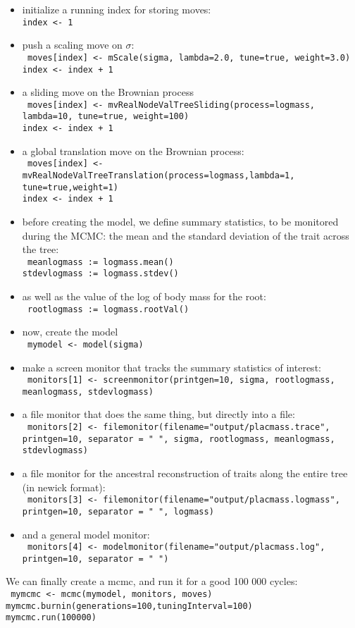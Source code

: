 \documentclass[usletter]{article}
\newcommand{\cmd}[1]{\texttt{#1}}
\begin{document}
\begin{itemize}
\item
initialize a running index for storing moves:
\\
\cmd{index <- 1}
\item
push a scaling move on $\sigma$:
\\
\cmd{
moves[index] <- mScale(sigma, lambda=2.0, tune=true, weight=3.0)
\\
index <- index + 1
}
\item
a sliding move on the Brownian process
\\
\cmd{
moves[index] <- mvRealNodeValTreeSliding(process=logmass, lambda=10, tune=true, weight=100)
\\
index <- index + 1
}
\item
a global translation move on the Brownian process:
\\
\cmd{
moves[index] <- mvRealNodeValTreeTranslation(process=logmass,lambda=1,
\\
tune=true,weight=1)
\\
index <- index + 1
}
\item
before creating the model, we define summary statistics, to be monitored during the MCMC: the mean and the standard deviation of the trait across the tree:
\\
\cmd{
meanlogmass := logmass.mean()
\\
stdevlogmass := logmass.stdev()
}
\item
as well as the value of the log of body mass for the root:
\\
\cmd{
rootlogmass := logmass.rootVal()
}
\item
now, create the model
\\
\cmd{
mymodel <- model(sigma)
}
\item
make a screen monitor that tracks the summary statistics of interest:
\\
\cmd{
monitors[1] <- screenmonitor(printgen=10, sigma, rootlogmass, meanlogmass, stdevlogmass)
}
\item
a file monitor that does the same thing, but directly into a file:
\\
\cmd{
monitors[2] <- filemonitor(filename="output/placmass.trace", printgen=10, separator = "       ", sigma, rootlogmass, meanlogmass, stdevlogmass)
}
\item
a file monitor for the ancestral reconstruction of traits along the entire tree (in newick format):
\\
\cmd{
monitors[3] <- filemonitor(filename="output/placmass.logmass", printgen=10, separator = "       ", logmass)
}
\item
and a general model monitor:
\\
\cmd{
monitors[4] <- modelmonitor(filename="output/placmass.log", printgen=10, separator = " ")
}
\end{itemize}
We can finally create a mcmc, and run it for a good 100 000 cycles:
\\
\cmd{
mymcmc <- mcmc(mymodel, monitors, moves)
\\
mymcmc.burnin(generations=100,tuningInterval=100)
\\
mymcmc.run(100000)
}
\end{document}
